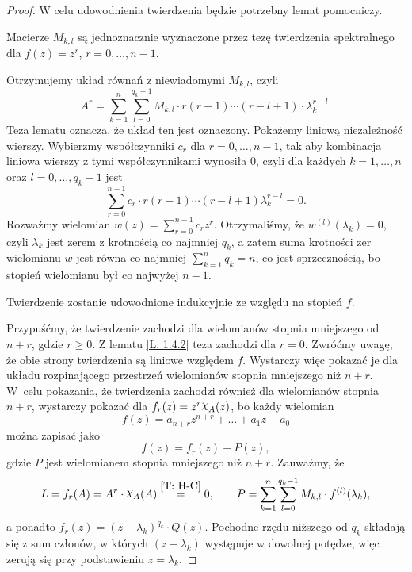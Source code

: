 \begin{proof}
  W celu udowodnienia twierdzenia będzie potrzebny lemat pomocniczy.
%
  \begin{nestedlemma} \label{L: 1.4.2}
    Macierze $M_{k,l}$ są jednoznacznie wyznaczone przez tezę twierdzenia spektralnego dla
    $f(z) = z^r$, $r = 0, \ldots, n-1$.
  \end{nestedlemma}
%
  \begin{nestedproof}
    Otrzymujemy układ równań z niewiadomymi $M_{k,l}$, czyli
%   
    \begin{equation*}
      A^r = \sum_{k=1}^n \sum_{l=0}^{q_k-1} M_{k,l} \cdot r (r-1) \cdots (r-l+1) \cdot \lambda_k^{r-l}.
    \end{equation*}
%   
    Teza lematu oznacza, że układ ten jest oznaczony. Pokażemy liniową niezależność wierszy. Wybierzmy współczynniki 
    $c_r$ dla $r = 0, \ldots, n-1$, tak aby kombinacja liniowa wierszy z tymi współczynnikami wynosiła $0$, czyli dla
    każdych $k = 1,\ldots,n$ oraz $l = 0, \ldots, q_k-1$ jest
%   
    \begin{equation*}
      \sum_{r=0}^{n-1} c_r \cdot r (r-1) \cdots (r-l+1) \lambda_k^{r-l} = 0.
    \end{equation*}
%
    Rozważmy wielomian $w(z) = \sum_{r=0}^{n-1} c_r z^r$. Otrzymaliśmy, że $w^{(l)}(\lambda_k) = 0$, czyli 
    $\lambda_k$ jest zerem z krotnością co najmniej $q_k$, a zatem suma krotności zer wielomianu $w$ jest równa co 
    najmniej $\sum_{k=1}^n q_k = n$, co jest sprzecznością, bo stopień wielomianu był co najwyżej $n-1$.
  \end{nestedproof}
%
  Twierdzenie zostanie udowodnione indukcyjnie ze względu na stopień $f$.
  
  Przypuśćmy, że twierdzenie zachodzi dla wielomianów stopnia mniejszego od $n+r$, gdzie $r \geq 0$. Z lematu 
  \ref{L: 1.4.2} teza zachodzi dla $r=0$. Zwróćmy uwagę, że obie strony twierdzenia są liniowe względem $f$. 
  Wystarczy więc pokazać je dla układu rozpinającego przestrzeń wielomianów stopnia mniejszego niż $n+r$. W~celu 
  pokazania, że twierdzenia zachodzi również dla wielomianów stopnia $n+r$, wystarczy pokazać dla $f_r(z) = z^r 
  \mychi_A(z)$, bo każdy wielomian
%
  \begin{equation*}
    f(z) = a_{n+r} z^{n+r} + \ldots + a_1 z + a_0
  \end{equation*}
%
  można zapisać jako
%
  \begin{equation*}
    f(z) = f_r(z) + P(z),
  \end{equation*}
%
  gdzie $P$ jest wielomianem stopnia mniejszego niż $n+r$. Zauważmy, że
%
  \begin{equation*}
    L = f_r(A) = A^r \cdot \mychi_A(A) \overset{\ref{T: H-C}}{=} 0, \qquad 
    P = \sum_{k=1}^n \sum_{l=0}^{q_k-1} M_{k,l} \cdot f^{(l)}(\lambda_k),
  \end{equation*}
%
  a ponadto $f_r(z) = (z-\lambda_k)^{q_k} \cdot Q(z)$. Pochodne rzędu niższego od $q_k$ składają się z sum członów, w 
  których $(z-\lambda_k)$ występuje w dowolnej potędze, więc zerują się przy podstawieniu $z=\lambda_k$.
%
\end{proof}
